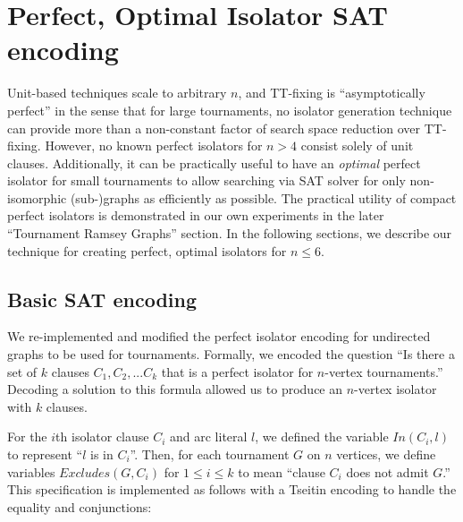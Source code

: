 \documentclass[conference]{IEEEtran}
\begin{document}







\section{Perfect, Optimal Isolator SAT encoding}

Unit-based techniques scale to arbitrary $n$, and TT-fixing is ``asymptotically perfect'' in the sense that for large tournaments, no isolator generation technique can provide more than a non-constant factor of search space reduction over TT-fixing. However, no known perfect isolators for $n>4$ consist solely of unit clauses. Additionally, it can be practically useful to have an \emph{optimal} perfect isolator for small tournaments to allow searching via SAT solver for only non-isomorphic (sub-)graphs as efficiently as possible. The practical utility of compact perfect isolators is demonstrated in our own experiments in the later ``Tournament Ramsey Graphs'' section. In the following sections, we describe our technique for creating perfect, optimal isolators for $n \le 6$.

\subsection{Basic SAT encoding}

We re-implemented and modified the perfect isolator encoding for undirected graphs \cite{ref_heule} to be used for tournaments. Formally, we encoded the question ``Is there a set of $k$ clauses $C_1, C_2, ... C_k$ that is a perfect isolator for $n$-vertex tournaments.'' Decoding a solution to this formula allowed us to produce an $n$-vertex isolator with $k$ clauses. %

For the $i$th isolator clause $C_i$ and arc literal $l$, we defined the variable $\mathit{In}(C_i, l)$ to represent ``$l$ is in $C_i$''. Then, for each tournament $G$ on $n$ vertices, we define variables $\mathit{Excludes}(G,C_i)$ for $1 \le i \le k$ to mean ``clause $C_i$ does not admit $G$.'' This specification is implemented as follows with a Tseitin encoding \cite{ref_tseitin} to handle the equality and conjunctions:
\end{document}
